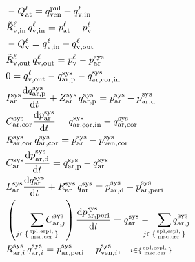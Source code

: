\documentclass[a4paper,12pt]{report}
\begin{document}
\begin{align}
&-Q_{\mathrm{at}}^{\ell} = q_{\mathrm{ven}}^{\mathrm{pul}} - q_{\mathrm{v,in}}^{\ell}\nonumber\\
&\tilde{R}_{\mathrm{v,in}}^{\ell}\,q_{\mathrm{v,in}}^{\ell} = p_{\mathrm{at}}^{\ell}-p_{\mathrm{v}}^{\ell}\nonumber\\
&-Q_{\mathrm{v}}^{\ell} = q_{\mathrm{v,in}}^{\ell} - q_{\mathrm{v,out}}^{\ell}\nonumber\\
&\tilde{R}_{\mathrm{v,out}}^{\ell}\,q_{\mathrm{v,out}}^{\ell} = p_{\mathrm{v}}^{\ell}-p_{\mathrm{ar}}^{\mathrm{sys}}\nonumber\\
&0 = q_{\mathrm{v,out}}^{\ell} - q_{\mathrm{ar,p}}^{\mathrm{sys}} - q_{\mathrm{ar,cor,in}}^{\mathrm{sys}}\nonumber\\
&I_{\mathrm{ar}}^{\mathrm{sys}} \frac{\mathrm{d}q_{\mathrm{ar,p}}^{\mathrm{sys}}}{\mathrm{d}t} + Z_{\mathrm{ar}}^{\mathrm{sys}}\,q_{\mathrm{ar,p}}^{\mathrm{sys}}=p_{\mathrm{ar}}^{\mathrm{sys}}-p_{\mathrm{ar,d}}^{\mathrm{sys}}\nonumber\\
&C_{\mathrm{ar,cor}}^{\mathrm{sys}} \frac{\mathrm{d}p_{\mathrm{ar}}^{\mathrm{sys}}}{\mathrm{d}t} = q_{\mathrm{ar,cor,in}}^{\mathrm{sys}} - q_{\mathrm{ar,cor}}^{\mathrm{sys}}\nonumber\\
&R_{\mathrm{ar,cor}}^{\mathrm{sys}}\,q_{\mathrm{ar,cor}}^{\mathrm{sys}} = p_{\mathrm{ar}}^{\mathrm{sys}} - p_{\mathrm{ven,cor}}^{\mathrm{sys}}\nonumber\\
&C_{\mathrm{ar}}^{\mathrm{sys}} \frac{\mathrm{d}p_{\mathrm{ar,d}}^{\mathrm{sys}}}{\mathrm{d}t} = q_{\mathrm{ar,p}}^{\mathrm{sys}} - q_{\mathrm{ar}}^{\mathrm{sys}}\nonumber\\
&L_{\mathrm{ar}}^{\mathrm{sys}}\frac{\mathrm{d}q_{\mathrm{ar}}^{\mathrm{sys}}}{\mathrm{d}t} + R_{\mathrm{ar}}^{\mathrm{sys}}\,q_{\mathrm{ar}}^{\mathrm{sys}}=p_{\mathrm{ar,d}}^{\mathrm{sys}} -p_{\mathrm{ar,peri}}^{\mathrm{sys}}\nonumber\\
&\left(\sum_{j\in\{\mathrm{spl,espl,\atop msc,cer}\}}\!\!\!\!\!\!\!\!\!C_{\mathrm{ar},j}^{\mathrm{sys}}\right) \frac{\mathrm{d}p_{\mathrm{ar,peri}}^{\mathrm{sys}}}{\mathrm{d}t} = q_{\mathrm{ar}}^{\mathrm{sys}}-\!\!\!\!\!\sum_{j\in\{\mathrm{spl,espl,\atop msc,cer}\}}\!\!\!\!\!\!\!\!\!q_{\mathrm{ar},j}^{\mathrm{sys}}\nonumber\\
&R_{\mathrm{ar},i}^{\mathrm{sys}}\,q_{\mathrm{ar},i}^{\mathrm{sys}} = p_{\mathrm{ar,peri}}^{\mathrm{sys}} - p_{\mathrm{ven},i}^{\mathrm{sys}}, \quad\scriptstyle{i\in\{\mathrm{spl,espl,\atop msc,cer}\}}\nonumber\\

\end{align}
\end{document}
